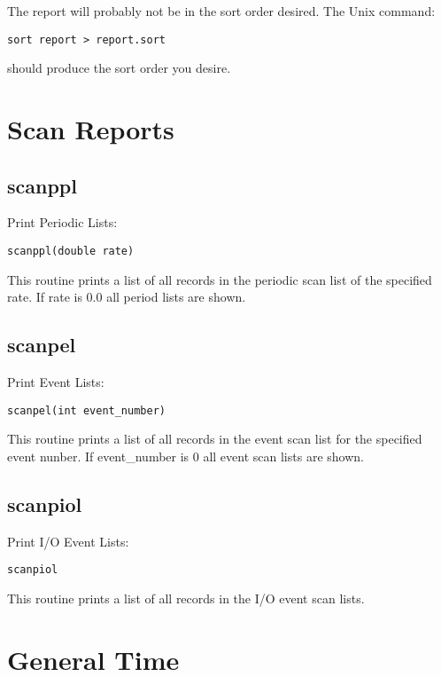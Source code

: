 The report will probably not be in the sort order desired. The Unix command:

\begin{verbatim}
sort report > report.sort
\end{verbatim}

should produce the sort order you desire.

\section{Scan Reports}

\subsection{scanppl}

Print Periodic Lists:

\begin{verbatim}
scanppl(double rate)
\end{verbatim}

This routine prints a list of all records in the periodic scan list of the specified rate. If rate is 0.0 all period lists are shown.

\subsection{scanpel}

Print Event Lists:

\begin{verbatim}
scanpel(int event_number)
\end{verbatim}

This routine prints a list of all records in the event scan list for the specified event nunber. If event\_number is 0 all event 
scan lists are shown.

\subsection{scanpiol}

Print I/O Event Lists:

\begin{verbatim}
scanpiol
\end{verbatim}

This routine prints a list of all records in the I/O event scan lists.

\section{General Time}

